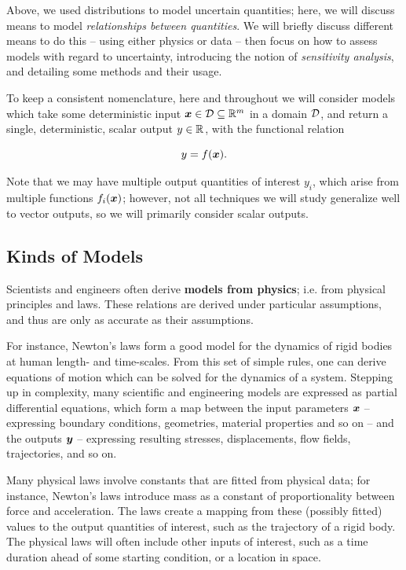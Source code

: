 \documentclass[../primer.tex]{subfiles}
\begin{document}
Above, we used distributions to model uncertain quantities; here, we will
discuss means to model \emph{relationships between quantities}. We will briefly
discuss different means to do this -- using either physics or data -- then focus
on how to assess models with regard to uncertainty, introducing the notion of
\emph{sensitivity analysis}, and detailing some methods and their usage.

To keep a consistent nomenclature, here and throughout we will consider models
which take some deterministic input $\boldsymbol{x} \in \mathcal{D} \subseteq \mathbb{R}^{m}$ in a domain
$\mathcal{D}$, and return a single, deterministic, scalar output $y \in \mathbb{R}^{}$, with the
functional relation

\begin{equation}
  y = f(\boldsymbol{x}).
\end{equation}

\noindent Note that we may have multiple output quantities of interest $y_i$,
which arise from multiple functions $f_i(\boldsymbol{x})$; however, not all techniques we
will study generalize well to vector outputs, so we will primarily consider
scalar outputs.

\subsection{Kinds of Models}
Scientists and engineers often derive \textbf{models from physics}; i.e. from
physical principles and laws. These relations are derived under particular
assumptions, and thus are only as accurate as their assumptions.

For instance, Newton's laws form a good model for the dynamics of rigid bodies
at human length- and time-scales. From this set of simple rules, one can derive
equations of motion which can be solved for the dynamics of a system. Stepping
up in complexity, many scientific and engineering models are expressed as
partial differential equations, which form a map between the input parameters
$\boldsymbol{x}$ -- expressing boundary conditions, geometries, material properties and so
on -- and the outputs $\boldsymbol{y}$ -- expressing resulting stresses, displacements,
flow fields, trajectories, and so on.

Many physical laws involve constants that are fitted from physical data; for
instance, Newton's laws introduce mass as a constant of proportionality between
force and acceleration. The laws create a mapping from these (possibly fitted)
values to the output quantities of interest, such as the trajectory of a rigid
body. The physical laws will often include other inputs of interest, such as a
time duration ahead of some starting condition, or a location in space.
\end{document}

